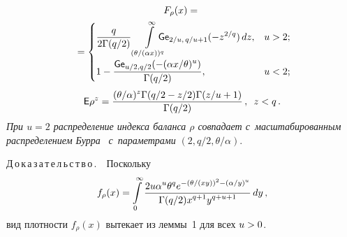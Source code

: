 \begin{multicols}{2}
\vspace*{-12pt}

\noindent
\begin{multline*}
F_\rho(x) ={}\\
{}=
 \begin{cases}
   \displaystyle \fr{q }{2\Gamma(q/2)}\int\limits_{(\theta/(\alpha 
x))^{q}}^\infty \hspace*{-10pt}{\sf Ge}_{2/u,\,q/u+1}(-z^{2/q}) \, dz, & u>2;\hspace*{-2pt}\\[16pt]
   \displaystyle 1 - \fr{{\sf Ge}_{u/2,q/2}(-(\alpha x/\theta)^u)}{\Gamma(q/2)}, 
&u<2;\hspace*{-2pt}\\
 \end{cases}
\end{multline*}
$$
{\sf E}\rho^z = \displaystyle\frac{\displaystyle (\theta/\alpha)^{z} \Gamma(q/2-
z/2)\Gamma(z/u+1)\mathstrut}{\displaystyle \Gamma(q/2)\mathstrut}\,, \enskip z<q\,.
$$
\textit{При $u=2$ распределение индекса баланса $\rho$ совпадает с~масштабированным 
распределением Бурра}~\cite{Burr1942} 
\textit{с~параметрами} $(2,q/2,\theta/\alpha)$.

\smallskip

\noindent
Д\,о\,к\,а\,з\,а\,т\,е\,л\,ь\,с\,т\,в\,о\,.\ \ Поскольку
$$
f_\rho(x) =
\int\limits_0^\infty \displaystyle\frac{\displaystyle 2u \alpha^{u}\theta^{q} e^{-(\theta/(xy))^2-
(\alpha/y)^u}\mathstrut}{\displaystyle \Gamma(q/2)x^{q +1}y^{q+u +1}\mathstrut}\, dy\,,
$$
вид плотности $f_\rho(x)$ вытекает из леммы~1 для всех $u\hm>0$.


\end{multicols}
